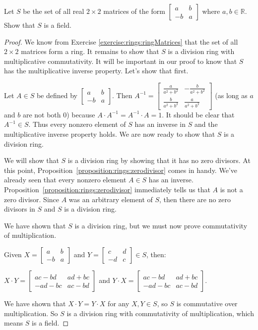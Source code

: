 \begin{example}
Let $S$ be the set of all real $2\times 2$ matrices of the form $\begin{bmatrix}
a & b\\
-b & a 
\end{bmatrix}$
where $a,b\in{\mathbb R}$.  Show that $S$ is a field.

\begin{proof}
We know from Exercise \ref{exercise:rings:ringMatrices} that the set of all $2\times 2$ matrices form a ring.  It remains to show that $S$ is a division ring with multiplicative commutativity.  It will be important in our proof to know that $S$ has the multiplicative inverse property.  Let's show that first.

Let $A\in S$ be defined by
$\begin{bmatrix}
a & b\\
-b & a
\end{bmatrix}.$
Then $A^{-1}=
\begin{bmatrix}
\frac{a}{a^2+b^2} & -\frac{b}{a^2+b^2}\\
\frac{b}{a^2+b^2} & \frac{a}{a^2+b^2}
\end{bmatrix}$ (as long as $a$ and $b$ are not both 0)
because $A\cdot A^{-1}=A^{-1}\cdot A=1$.  It should be clear that $A^{-1}\in S$.  Thus every nonzero element of $S$ has an inverse in $S$ and the multiplicative inverse property holds.  We are now ready to show that $S$ is a division ring.

We will show that $S$ is a division ring by showing that it has no zero divisors.  At this point, Proposition~\ref{proposition:rings:zerodivisor} comes in handy.  We've already seen that every nonzero element  $A \in S$ has an inverse. Proposition~\ref{proposition:rings:zerodivisor} immediately tells us that $A$ is not a zero divisor. Since $A$ was an arbitrary element of $S$, then there are no zero divisors in $S$ and $S$ is a division ring.
  
We have shown that $S$ is a division ring, but we must now prove commutativity of multiplication.

Given $X=
\begin{bmatrix}
a & b\\
-b & a
\end{bmatrix}$
and $Y=
\begin{bmatrix}
c & d\\
-d & c
\end{bmatrix}
\in S$, then: 

$X\cdot Y=
\begin{bmatrix}
ac-bd & ad+bc\\
-ad-bc & ac-bd
\end{bmatrix}$
and $Y\cdot X=
\begin{bmatrix}
ac-bd & ad+bc\\
-ad-bc & ac-bd
\end{bmatrix}. $

We have shown that $X\cdot Y=Y\cdot X$ for any $X,Y\in S$, so $S$ is commutative over multiplication.  So $S$ is a division ring with commutativity of multiplication, which means $S$ is a field.
\end{proof}
\end{example}

